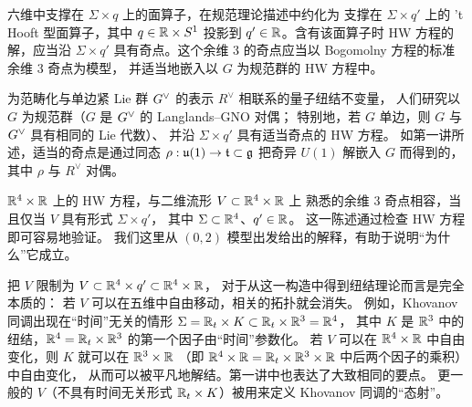 
六维中支撑在 $\Sigma\times q$ 上的面算子，在规范理论描述中约化为
支撑在 $\Sigma\times q'$ 上的 't Hooft 型面算子，其中 $q\in\mathbb{R}\times S^1$
投影到 $q'\in\mathbb{R}$。含有该面算子时 HW 方程的解，应当沿 $\Sigma\times q'$
具有奇点。这个余维 3 的奇点应当以 Bogomolny 方程的标准余维 3 奇点为模型，
并适当地嵌入以 $G$ 为规范群的 HW 方程中。


为范畴化与单边紧 Lie 群 $G^{\vee}$ 的表示 $R^{\vee}$ 相联系的量子纽结不变量，
人们研究以 $G$ 为规范群（$G$ 是 $G^{\vee}$ 的 Langlands–GNO 对偶；
特别地，若 $G$ 单边，则 $G$ 与 $G^{\vee}$ 具有相同的 Lie 代数）、
并沿 $\Sigma\times q'$ 具有适当奇点的 HW 方程。
如第一讲所述，适当的奇点是通过同态 $\rho:\mathfrak{u}(1)\to\mathfrak{t}\subset\mathfrak{g}$
把奇异 $U(1)$ 解嵌入 $G$ 而得到的，其中 $\rho$ 与 $R^{\vee}$ 对偶。


$\mathbb{R}^4\times\mathbb{R}$ 上的 HW 方程，与二维流形 $V\subset\mathbb{R}^4\times\mathbb{R}$ 上
熟悉的余维 3 奇点相容，当且仅当 $V$ 具有形式 $\Sigma\times q'$，
其中 $\Sigma\subset\mathbb{R}^4$、$q'\in\mathbb{R}$。
这一陈述通过检查 HW 方程即可容易地验证。
我们这里从 $(0,2)$ 模型出发给出的解释，有助于说明“为什么”它成立。

把 $V$ 限制为 $V\subset\mathbb{R}^4\times q'\subset\mathbb{R}^4\times\mathbb{R}$，
对于从这一构造中得到纽结理论而言是完全本质的：
若 $V$ 可以在五维中自由移动，相关的拓扑就会消失。
例如，Khovanov 同调出现在“时间”无关的情形
$\Sigma=\mathbb{R}_t\times K\subset\mathbb{R}_t\times\mathbb{R}^3=\mathbb{R}^4$，
其中 $K$ 是 $\mathbb{R}^3$ 中的纽结，$\mathbb{R}^4=\mathbb{R}_t\times\mathbb{R}^3$ 的第一个因子由“时间”参数化。
若 $V$ 可以在 $\mathbb{R}^4\times\mathbb{R}$ 中自由变化，则 $K$ 就可以在 $\mathbb{R}^3\times\mathbb{R}$
（即 $\mathbb{R}^4\times\mathbb{R}=\mathbb{R}_t\times\mathbb{R}^3\times\mathbb{R}$ 中后两个因子的乘积）中自由变化，
从而可以被平凡地解结。第一讲中也表达了大致相同的要点。
更一般的 $V$（不具有时间无关形式 $\mathbb{R}_t\times K$）被用来定义
Khovanov 同调的“态射”。

